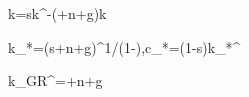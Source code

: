\dot k=sk^\alpha-(\delta+n+g)k

k_*=\left(\frac s{\delta+n+g}\right)^{1/(1-\alpha)},\qquad c_*=(1-s)k_*^\alpha

\alpha k_{GR}^{}=\delta+n+g
